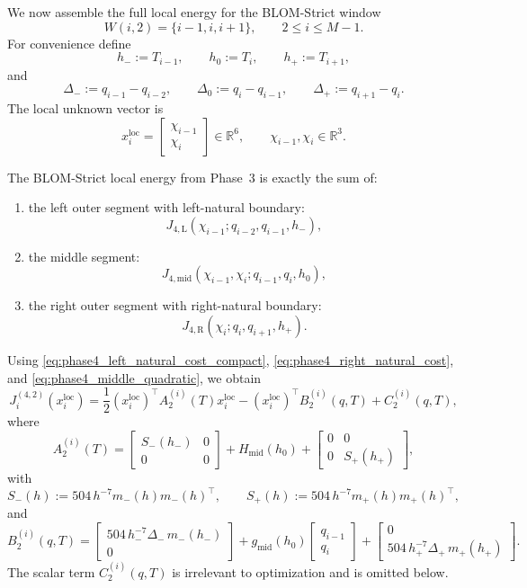 We now assemble the full local energy for the BLOM-Strict window
\[
W(i,2)=\{i-1,i,i+1\},
\qquad 2\le i\le M-1.
\]
For convenience define
\[
h_-:=T_{i-1},\qquad h_0:=T_i,\qquad h_+:=T_{i+1},
\]
and
\[
\Delta_-:=q_{i-1}-q_{i-2},
\qquad
\Delta_0:=q_i-q_{i-1},
\qquad
\Delta_+:=q_{i+1}-q_i.
\]
The local unknown vector is
\[
x_i^{\mathrm{loc}}
=
\begin{bmatrix}
\chi_{i-1}\\ \chi_i
\end{bmatrix}
\in\mathbb R^6,
\qquad
\chi_{i-1},\chi_i\in\mathbb R^3.
\]

The BLOM-Strict local energy from Phase~3 is exactly the sum of:
\begin{enumerate}
    \item the left outer segment with left-natural boundary:
    \[
    J_{4,\mathrm{L}}(\chi_{i-1};q_{i-2},q_{i-1},h_-),
    \]
    \item the middle segment:
    \[
    J_{4,\mathrm{mid}}(\chi_{i-1},\chi_i;q_{i-1},q_i,h_0),
    \]
    \item the right outer segment with right-natural boundary:
    \[
    J_{4,\mathrm{R}}(\chi_i;q_i,q_{i+1},h_+).
    \]
\end{enumerate}
Using \eqref{eq:phase4_left_natural_cost_compact}, \eqref{eq:phase4_right_natural_cost}, and
\eqref{eq:phase4_middle_quadratic}, we obtain
\begin{equation}
\label{eq:phase4_total_local_quadratic}
J_i^{(4,2)}(x_i^{\mathrm{loc}})
=
\frac{1}{2}(x_i^{\mathrm{loc}})^\top A_2^{(i)}(T)x_i^{\mathrm{loc}}
-
(x_i^{\mathrm{loc}})^\top B_2^{(i)}(q,T)
+
C_2^{(i)}(q,T),
\end{equation}
where
\begin{equation}
\label{eq:phase4_A2_def}
A_2^{(i)}(T)
=
\begin{bmatrix}
S_-(h_-) & 0\\
0 & 0
\end{bmatrix}
+
H_{\mathrm{mid}}(h_0)
+
\begin{bmatrix}
0 & 0\\
0 & S_+(h_+)
\end{bmatrix},
\end{equation}
with
\begin{equation}
\label{eq:phase4_outer_hessian_blocks}
S_-(h):=504\,h^{-7}m_-(h)m_-(h)^\top,
\qquad
S_+(h):=504\,h^{-7}m_+(h)m_+(h)^\top,
\end{equation}
and
\begin{equation}
\label{eq:phase4_B2_def}
B_2^{(i)}(q,T)
=
\begin{bmatrix}
504\,h_-^{-7}\Delta_-\,m_-(h_-)\\[0.5ex]
0
\end{bmatrix}
+
g_{\mathrm{mid}}(h_0)
\begin{bmatrix}
q_{i-1}\\ q_i
\end{bmatrix}
+
\begin{bmatrix}
0\\[0.5ex]
504\,h_+^{-7}\Delta_+\,m_+(h_+)
\end{bmatrix}.
\end{equation}
The scalar term \(C_2^{(i)}(q,T)\) is irrelevant to optimization and is omitted below.

